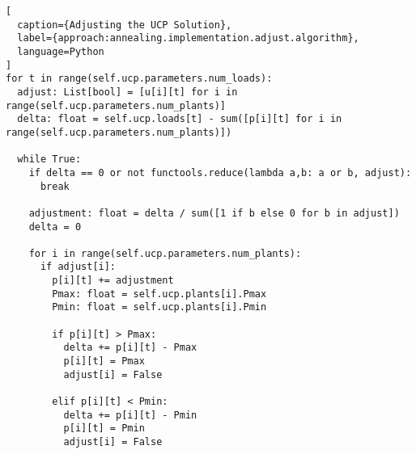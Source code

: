\begin{lstlisting}[
  caption={Adjusting the UCP Solution},
  label={approach:annealing.implementation.adjust.algorithm},
  language=Python
]
for t in range(self.ucp.parameters.num_loads):
  adjust: List[bool] = [u[i][t] for i in range(self.ucp.parameters.num_plants)]
  delta: float = self.ucp.loads[t] - sum([p[i][t] for i in range(self.ucp.parameters.num_plants)])

  while True:
    if delta == 0 or not functools.reduce(lambda a,b: a or b, adjust):
      break

    adjustment: float = delta / sum([1 if b else 0 for b in adjust])
    delta = 0

    for i in range(self.ucp.parameters.num_plants):
      if adjust[i]:
        p[i][t] += adjustment
        Pmax: float = self.ucp.plants[i].Pmax
        Pmin: float = self.ucp.plants[i].Pmin

        if p[i][t] > Pmax:
          delta += p[i][t] - Pmax
          p[i][t] = Pmax
          adjust[i] = False

        elif p[i][t] < Pmin:
          delta += p[i][t] - Pmin
          p[i][t] = Pmin
          adjust[i] = False
\end{lstlisting}
